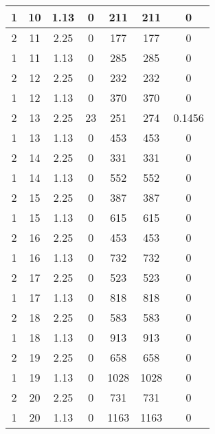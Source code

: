 \documentclass[letterpaper, 12pt]{article}
\begin{document}
\begin{longtable}{|c|c|c|c|c|c|c|}
\hline
1 & 10 & 1.13 & 0 & 211 & 211 & 0 \\
\hline
2 & 11 & 2.25 & 0 & 177 & 177 & 0 \\
\hline
1 & 11 & 1.13 & 0 & 285 & 285 & 0 \\
\hline
2 & 12 & 2.25 & 0 & 232 & 232 & 0 \\
\hline
1 & 12 & 1.13 & 0 & 370 & 370 & 0 \\
\hline
2 & 13 & 2.25 & 23 & 251 & 274 & 0.1456 \\
\hline
1 & 13 & 1.13 & 0 & 453 & 453 & 0 \\
\hline
2 & 14 & 2.25 & 0 & 331 & 331 & 0 \\
\hline
1 & 14 & 1.13 & 0 & 552 & 552 & 0 \\
\hline
2 & 15 & 2.25 & 0 & 387 & 387 & 0 \\
\hline
1 & 15 & 1.13 & 0 & 615 & 615 & 0 \\
\hline
2 & 16 & 2.25 & 0 & 453 & 453 & 0 \\
\hline
1 & 16 & 1.13 & 0 & 732 & 732 & 0 \\
\hline
2 & 17 & 2.25 & 0 & 523 & 523 & 0 \\
\hline
1 & 17 & 1.13 & 0 & 818 & 818 & 0 \\
\hline
2 & 18 & 2.25 & 0 & 583 & 583 & 0 \\
\hline
1 & 18 & 1.13 & 0 & 913 & 913 & 0 \\
\hline
2 & 19 & 2.25 & 0 & 658 & 658 & 0 \\
\hline
1 & 19 & 1.13 & 0 & 1028 & 1028 & 0 \\
\hline
2 & 20 & 2.25 & 0 & 731 & 731 & 0 \\
\hline
1 & 20 & 1.13 & 0 & 1163 & 1163 & 0 \\
\hline
\end{longtable}
\end{document}
